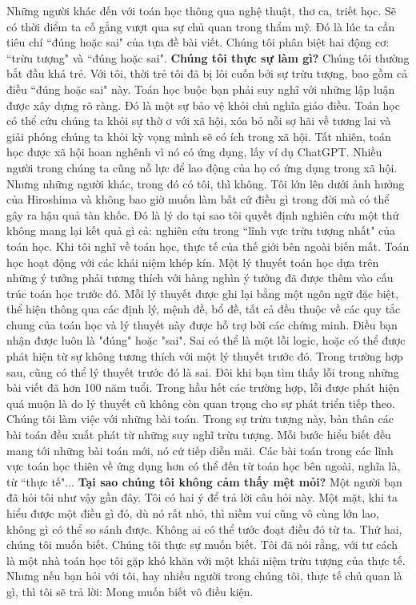 \begin{multicols}{2}
	\vskip 0.1cm
	Những người khác đến với toán học thông qua nghệ thuật, thơ ca, triết học. Sẽ có thời điểm ta cố gắng vượt qua sự chủ quan trong thẩm mỹ. Đó là lúc ta cần tiêu chí ``đúng hoặc sai" của tựa đề bài viết. Chúng tôi phân biệt hai động cơ: ``trừu tượng" và ``đúng hoặc sai".
	\vskip 0.1cm
	\textbf{\color{quantoan}Chúng tôi thực sự làm gì?}
	\vskip 0.1cm
	Chúng tôi thường bắt đầu khá trẻ. Với tôi, thời trẻ tôi đã bị lôi cuốn bởi sự trừu tượng, bao gồm cả điều ``đúng hoặc sai" này. Toán học buộc bạn phải suy nghĩ với những lập luận được xây dựng rõ ràng. Đó là một sự bảo vệ khỏi chủ nghĩa giáo điều. Toán học có thể cứu chúng ta khỏi sự thờ ơ với xã hội, xóa bỏ nỗi sợ hãi về tương lai và giải phóng chúng ta khỏi kỳ vọng mình sẽ có ích trong xã hội. Tất nhiên, toán học được xã hội hoan nghênh vì nó có ứng dụng, lấy ví dụ ChatGPT. 
	\vskip 0.1cm
	Nhiều người trong chúng ta cũng nỗ lực để lao động của họ có ứng dụng trong xã hội. Nhưng những người khác, trong đó có tôi, thì không. Tôi lớn lên dưới ảnh hưởng của Hiroshima và không bao giờ muốn làm bất cứ điều gì trong đời mà có thể gây ra hậu quả tàn khốc. Đó là lý do tại sao tôi quyết định nghiên cứu một thứ không mang lại kết quả gì cả: nghiên cứu trong ``lĩnh vực trừu tượng nhất" của toán học. Khi tôi nghĩ về toán học, thực tế của thế giới bên ngoài biến mất. Toán học hoạt động với các khái niệm khép kín. Một lý thuyết toán học dựa trên những ý tưởng phải tương thích với hàng nghìn ý tưởng đã được thêm vào cấu trúc toán học trước đó. Mỗi lý thuyết được ghi lại bằng một ngôn ngữ đặc biệt, thể hiện thông qua các định lý, mệnh đề, bổ đề, tất cả đều thuộc về các quy tắc chung của toán học và lý thuyết này được hỗ trợ bởi các chứng minh. 
	\vskip 0.1cm
	Điều bạn nhận được luôn là "đúng" hoặc "sai". Sai có thể là một lỗi logic, hoặc có thể được phát hiện từ sự không tương thích với một lý thuyết trước đó. Trong trường hợp sau, cũng có thể lý thuyết trước đó là sai. Đôi khi bạn tìm thấy lỗi trong những bài viết đã hơn 100 năm tuổi. Trong hầu hết các trường hợp, lỗi được phát hiện quá muộn là do lý thuyết cũ không còn quan trọng cho sự phát triển tiếp theo. Chúng tôi làm việc với những bài toán. Trong sự trừu tượng này, bản thân các bài toán đều xuất phát từ những suy nghĩ trừu tượng. Mỗi bước hiểu biết đều mang tới những bài toán mới, nó cứ tiếp diễn mãi. Các bài toán trong các lĩnh vực toán học thiên về ứng dụng hơn có thể đến từ toán học bên ngoài, nghĩa là, từ ``thực tế"...
	\vskip 0.1cm
	\textbf{\color{quantoan}Tại sao chúng tôi không cảm thấy mệt mỏi?}
	\vskip 0.1cm
	Một người bạn đã hỏi tôi như vậy gần đây. Tôi có hai ý để trả lời câu hỏi này. Một mặt, khi ta hiểu được một điều gì đó, dù nó rất nhỏ, thì niềm vui cũng vô cùng lớn lao, không gì có thể so sánh được. Không ai có thể tước đoạt điều đó từ ta. Thứ hai, chúng tôi muốn biết. Chúng tôi thực sự muốn biết. Tôi đã nói rằng, với tư cách là một nhà toán học tôi gặp khó khăn với một khái niệm trừu tượng của thực tế. Nhưng nếu bạn hỏi với tôi, hay nhiều người trong chúng tôi, thực tế chủ quan là gì, thì tôi sẽ trả lời: Mong muốn biết vô điều kiện. 
\end{multicols}